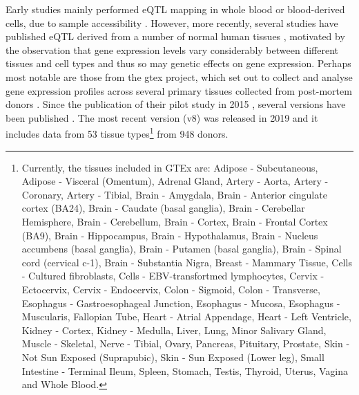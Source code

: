 Early studies mainly performed eQTL mapping in whole blood or blood-derived cells, due to sample accessibility \cite{stranger2007population, pickrell2010understanding}.
However, more recently, several studies have published eQTL derived from a number of normal human tissues \cite{myers2007survey, zhong2010liver,fu2012unraveling, nica2011architecture, dimas2009common, fairfax2012genetics, stranger2012patterns, schadt2008mapping, hao2012lung, innocenti2011identification}, motivated by the observation that gene expression levels vary considerably between different tissues and cell types \cite{su2002large} and thus so may genetic effects on gene expression.
Perhaps most notable are those from the \gls{gtex} project, which set out to collect and analyse gene expression profiles across several primary tissues collected from post-mortem donors \cite{lonsdale2013genotype}.
Since the publication of their pilot study in 2015 \cite{gtex2015genotype}, several versions have been published \cite{gtex2017genetic, aguet2019gtex}.
The most recent version (v8) was released in 2019 and it includes data from 53 tissue types\footnote{Currently, the tissues included in GTEx are: Adipose - Subcutaneous, Adipose - Visceral (Omentum), Adrenal Gland, Artery - Aorta, Artery - Coronary, Artery - Tibial, 
Brain - Amygdala, Brain - Anterior cingulate cortex (BA24), Brain - Caudate (basal ganglia), Brain - Cerebellar Hemisphere, Brain - Cerebellum, Brain - Cortex, Brain - Frontal Cortex (BA9), Brain - Hippocampus, Brain - Hypothalamus, Brain - Nucleus accumbens (basal ganglia), Brain - Putamen (basal ganglia), Brain - Spinal cord (cervical c-1), Brain - Substantia Nigra, 
Breast - Mammary Tissue, Cells - Cultured fibroblasts, Cells - EBV-transfortmed lymphocytes,  Cervix - Ectocervix, Cervix - Endocervix, Colon - Sigmoid, Colon - Transverse, Esophagus - Gastroesophageal Junction, Esophagus - Mucosa, Esophagus - Muscularis, Fallopian Tube, Heart - Atrial Appendage, Heart - Left Ventricle, Kidney - Cortex, Kidney - Medulla, Liver, Lung,  Minor Salivary Gland, Muscle - Skeletal, Nerve - Tibial, Ovary, Pancreas, Pituitary, Prostate, Skin - Not Sun Exposed (Suprapubic), Skin - Sun Exposed (Lower leg), Small Intestine - Terminal Ileum, Spleen, Stomach, Testis, Thyroid, Uterus, Vagina and Whole Blood.} from 948 donors.\\

